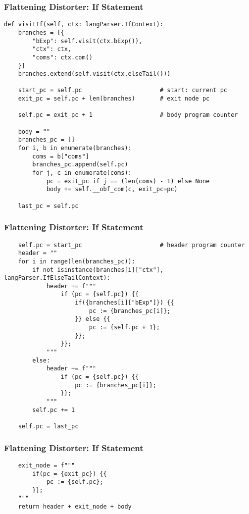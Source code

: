 \documentclass{beamer}
\begin{document}
\begin{frame}[fragile]
    \frametitle{Flattening Distorter: If Statement}
    \scriptsize
    \begin{verbatim}
def visitIf(self, ctx: langParser.IfContext):
    branches = [{
        "bExp": self.visit(ctx.bExp()),
        "ctx": ctx,
        "coms": ctx.com()
    }]
    branches.extend(self.visit(ctx.elseTail()))

    start_pc = self.pc                      # start: current pc
    exit_pc = self.pc + len(branches)       # exit node pc

    self.pc = exit_pc + 1                   # body program counter

    body = ""
    branches_pc = []
    for i, b in enumerate(branches):
        coms = b["coms"]
        branches_pc.append(self.pc)
        for j, c in enumerate(coms):
            pc = exit_pc if j == (len(coms) - 1) else None
            body += self.__obf_com(c, exit_pc=pc)

    last_pc = self.pc

    \end{verbatim}
\end{frame}

\begin{frame}[fragile]
    \frametitle{Flattening Distorter: If Statement}
    \scriptsize
    \begin{verbatim}
    self.pc = start_pc                      # header program counter
    header = ""
    for i in range(len(branches_pc)):
        if not isinstance(branches[i]["ctx"], langParser.IfElseTailContext):
            header += f"""
                if (pc = {self.pc}) {{
                    if({branches[i]["bExp"]}) {{
                        pc := {branches_pc[i]};
                    }} else {{
                        pc := {self.pc + 1};
                    }};
                }};
            """
        else:
            header += f"""
                if (pc = {self.pc}) {{
                    pc := {branches_pc[i]};
                }};
            """
        self.pc += 1

    self.pc = last_pc
\end{verbatim}
\end{frame}

\begin{frame}[fragile]
    \frametitle{Flattening Distorter: If Statement}
    \scriptsize
    \begin{verbatim}
    exit_node = f"""
        if(pc = {exit_pc}) {{
            pc := {self.pc};
        }};
    """
    return header + exit_node + body
    \end{verbatim}
\end{frame}
\end{document}
